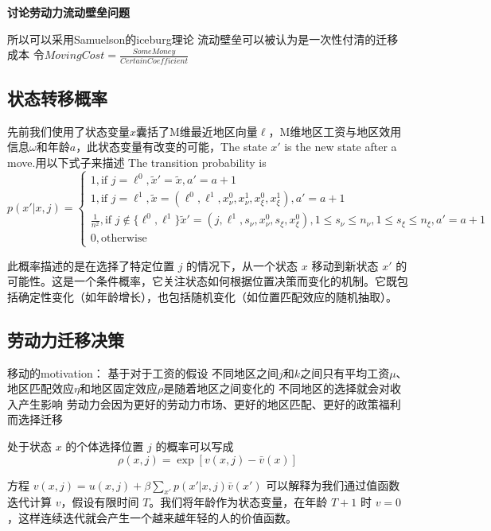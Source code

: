\documentclass[a4paper,12pt]{article}
\begin{document}
\textbf{讨论劳动力流动壁垒问题}

所以可以采用Samuelson的iceburg理论 流动壁垒可以被认为是一次性付清的迁移成本
令$MovingCost = \frac{SomeMoney}{CertainCoefficient}$

\subsection{状态转移概率}
先前我们使用了状态变量$x$囊括了M维最近地区向量$\ell$，M维地区工资与地区效用信息$\omega$和年龄$a$，此状态变量有改变的可能，The state $x'$ is the new state after a move.用以下式子来描述
The transition probability is 
\begin{equation}
  p(x'|x,j)=
  \begin{cases}
    1, \text{if }j=\ell^0,\tilde x'=\tilde x,a'=a+1
    \\
    1, \text{if }j=\ell^1,\tilde x =(\ell^0,\ell^1,x_\nu^0,x_\nu^1,x_\xi^0,x_\xi^1),a'=a+1
    \\
    \frac{1}{n^2}, \text{if }j \notin \{\ell^0,\ell^1\}\tilde x'=(j,\ell^1,s_\nu,x_\nu^0,s_\xi,x_\xi^0),1\leqslant s_\nu \leqslant n_\nu,1\leqslant s_\xi \leqslant n_\xi,a'=a+1
    \\
    0, \text{otherwise}
  \end{cases}
\end{equation}

此概率描述的是在选择了特定位置 $j$ 的情况下，从一个状态 $x$ 移动到新状态 $x'$ 的可能性。这是一个条件概率，它关注状态如何根据位置决策而变化的机制。它既包括确定性变化（如年龄增长），也包括随机变化（如位置匹配效应的随机抽取）。

\subsection{劳动力迁移决策}
移动的motivation：
基于对于工资的假设
不同地区之间$j$和$k$之间只有平均工资$\mu$、地区匹配效应$\eta$和地区固定效应$\rho$是随着地区之间变化的
不同地区的选择就会对收入产生影响
劳动力会因为更好的劳动力市场、更好的地区匹配、更好的政策福利而选择迁移


处于状态 $x$ 的个体选择位置 $j$ 的概率可以写成
\begin{equation}
  \rho(x,j)=\exp[v(x,j)-\bar v(x)]
\end{equation}

方程 $v(x, j) = u(x, j) + \beta \sum\limits_{x'} p(x' | x, j) \bar{v}(x')$ 可以解释为我们通过值函数迭代计算 $v$，假设有限时间 $T$。我们将年龄作为状态变量，在年龄 $T+1$ 时 $v=0$，这样连续迭代就会产生一个越来越年轻的人的价值函数。
\end{document}
